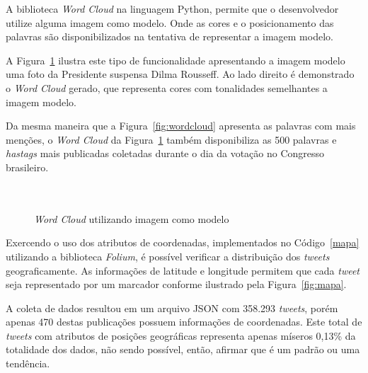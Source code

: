 A biblioteca \textit{Word Cloud} na linguagem Python, permite que o desenvolvedor utilize alguma imagem como modelo. Onde as cores e o posicionamento das palavras são disponibilizados na tentativa de representar a imagem modelo.

A Figura~\ref{fig:worddilma} ilustra este tipo de funcionalidade apresentando a imagem modelo uma foto da Presidente suspensa Dilma Rousseff. Ao lado direito é demonstrado o \textit{Word Cloud} gerado, que representa cores com tonalidades semelhantes a imagem modelo.

Da mesma maneira que a Figura~\ref{fig:wordcloud} apresenta as palavras com mais menções, o \textit{Word Cloud} da Figura~\ref{fig:worddilma} também disponibiliza as 500 palavras e \textit{hastags} mais publicadas coletadas durante o dia da votação no Congresso brasileiro. \\ \\ \\

\begin{figure}[h]
	\centering
	\caption{\textit{Word Cloud} utilizando imagem como modelo}
	\vspace{-0.3cm}
	\label{fig:worddilma}
\end{figure}

Exercendo o uso dos atributos de coordenadas, implementados no Código~\ref{mapa} utilizando a biblioteca \textit{Folium}, é possível verificar a distribuição dos \textit{tweets} geograficamente. As informações de latitude e longitude permitem que cada \textit{tweet} seja representado por um marcador conforme ilustrado pela Figura~\ref{fig:mapa}.

A coleta de dados resultou em um arquivo JSON com 358.293 \textit{tweets}, porém apenas 470 destas publicações possuem informações de coordenadas. Este total de \textit{tweets} com atributos de posições geográficas representa apenas míseros 0,13\% da totalidade dos dados, não sendo possível, então, afirmar que é um padrão ou uma tendência.

